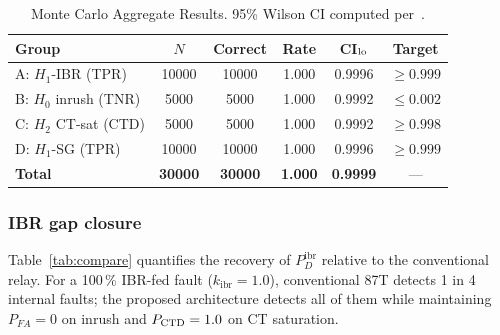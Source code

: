 \documentclass[journal,twoside,10pt]{IEEEtran}
\newcommand{\kibr}{k_{\mathrm{ibr}}}
\newcommand{\Pdibr}{P_D^{\mathrm{ibr}}}
\begin{document}
\begin{table}[!t]
\centering
\caption{Monte Carlo Aggregate Results.
         95\% Wilson CI computed per~\cite{Wilson1927}.}
\label{tab:mc}
\renewcommand{\arraystretch}{1.08}
\footnotesize\setlength{\tabcolsep}{4pt}
\begin{tabular}{p{2.6cm}ccccc}
\toprule
Group & $N$ & Correct & Rate & CI$_{\rm lo}$ & Target \\
\midrule
A: $H_1$-IBR (TPR)  & 10000 & 10000 & 1.000  & 0.9996 & $\geq 0.999$ \\
B: $H_0$ inrush (TNR)& 5000 & 5000  & 1.000  & 0.9992 & $\leq 0.002$ \\
C: $H_2$ CT-sat (CTD)& 5000 & 5000  & 1.000  & 0.9992 & $\geq 0.998$ \\
D: $H_1$-SG (TPR)   & 10000 & 10000 & 1.000  & 0.9996 & $\geq 0.999$ \\
\midrule
\textbf{Total}       & \textbf{30000} & \textbf{30000} & \textbf{1.000}
  & \textbf{0.9999} & --- \\
\bottomrule
\end{tabular}
\end{table}

\subsubsection{IBR gap closure}

Table~\ref{tab:compare} quantifies the recovery of $\Pdibr$ relative to
the conventional relay. For a 100\,\% IBR-fed fault ($\kibr = 1.0$),
conventional 87T detects 1 in 4 internal faults; the proposed architecture
detects all of them while maintaining $P_{FA} = 0$ on inrush and
$P_{\rm CTD} = 1.0$ on CT saturation.
\end{document}
